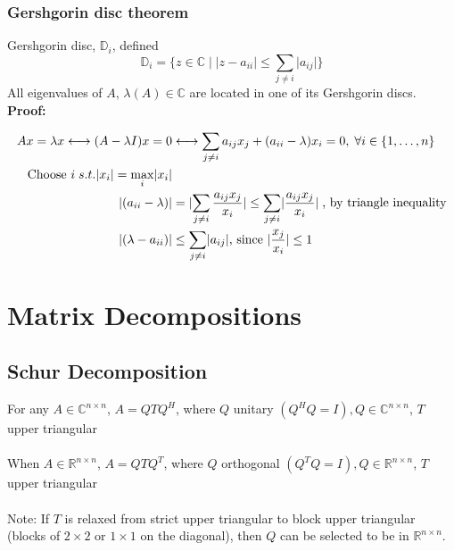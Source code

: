 \documentclass{article}
\begin{document}
\subsubsection{Gershgorin disc theorem}
Gershgorin disc, $\mathbb{D}_i$, defined
\begin{equation*}
    \mathbb{D}_i = \{z \in \mathbb{C} \mid \lvert z - a_{ii}\rvert \leq \sum_{j \neq i} \lvert a_{ij}\rvert\}
\end{equation*}
All eigenvalues of $A$, $\lambda(A) \in \mathbb{C}$ are located in one of its Gershgorin discs. \textbf{Proof:}

\begin{align*}
    Ax = \lambda x \longleftrightarrow (A - \lambda I)x = 0 &\longleftrightarrow \sum_{j \neq i} a_{ij}x_j + (a_{ii} - \lambda)x_i = 0, \; \forall \space i \in \{1, \dots, n\}\\
    \textrm{Choose } i \; s.t. \lvert x_i\rvert  = \max_{i} \lvert x_i \rvert  \\
    \lvert (a_{ii} - \lambda) \rvert &= \lvert \sum_{j \neq i} \frac{a_{ij}x_j}{x_i}\rvert
    \leq \sum_{j \neq i} \lvert \frac{a_{ij}x_j}{x_i}\rvert \; \textrm{, by triangle inequality}\\
    \lvert (\lambda - a_{ii}) \rvert &\leq \sum_{j \neq i} \lvert a_{ij}\rvert 
    \textrm{, since $\lvert \frac{x_j}{x_i} \rvert \leq 1$}
\end{align*}

\section{Matrix Decompositions}
\subsection{Schur Decomposition}
For any $A \in \mathbb{C}^{n \times n}$, $A = QTQ^H$, where $Q$ unitary $(Q^HQ = I), Q \in \mathbb{C}^{n \times n}$, $T$ upper triangular\\ \\
When $A \in \mathbb{R}^{n \times n}$, $A = QTQ^T$, where $Q$ orthogonal $(Q^TQ = I), Q \in \mathbb{R}^{n \times n}$, $T$ upper triangular\\ \\
Note: If $T$ is relaxed from strict upper triangular to block upper triangular (blocks of $2\times 2$ or $1 \times 1$ on the diagonal), then $Q$ can be selected to be in $\mathbb{R}^{n\times n}$.


\end{document}
